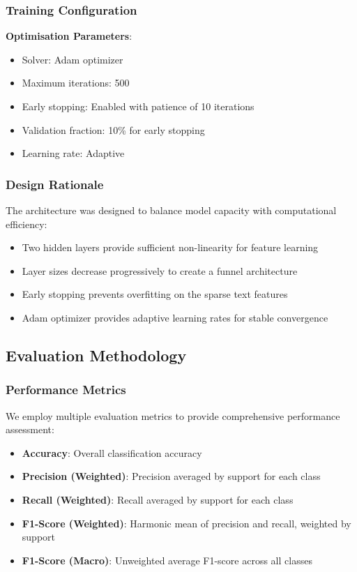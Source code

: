 \documentclass[11pt,a4paper]{article}
\begin{document}
\subsubsection{Training Configuration}

\textbf{Optimisation Parameters}:
\begin{itemize}
    \item Solver: Adam optimizer
    \item Maximum iterations: 500
    \item Early stopping: Enabled with patience of 10 iterations
    \item Validation fraction: 10\% for early stopping
    \item Learning rate: Adaptive
\end{itemize}

\subsubsection{Design Rationale}

The architecture was designed to balance model capacity with computational efficiency:
\begin{itemize}
    \item Two hidden layers provide sufficient non-linearity for feature learning
    \item Layer sizes decrease progressively to create a funnel architecture
    \item Early stopping prevents overfitting on the sparse text features
    \item Adam optimizer provides adaptive learning rates for stable convergence
\end{itemize}

\subsection{Evaluation Methodology}

\subsubsection{Performance Metrics}

We employ multiple evaluation metrics to provide comprehensive performance assessment:

\begin{itemize}
    \item \textbf{Accuracy}: Overall classification accuracy
    \item \textbf{Precision (Weighted)}: Precision averaged by support for each class
    \item \textbf{Recall (Weighted)}: Recall averaged by support for each class
    \item \textbf{F1-Score (Weighted)}: Harmonic mean of precision and recall, weighted by support
    \item \textbf{F1-Score (Macro)}: Unweighted average F1-score across all classes
\end{itemize}
\end{document}
